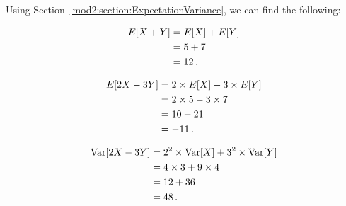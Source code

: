 %
%

\begin{subquestions}
	

\subquestion

Using Section~\ref{mod2:section:ExpectationVariance}, we can find the following:

\begin{subsubquestions}
	
\subsubquestion

\begin{align}
	E[X+Y] & = E[X] + E[Y] \nonumber \\
	       & = 5 + 7 \nonumber \\
	       & = 12 \,.
\end{align}


\subsubquestion

\begin{align}
	E[2X-3Y] & = 2 \times E[X] - 3 \times E[Y] \nonumber \\
	& = 2 \times 5 - 3 \times 7 \nonumber \\
	& = 10 - 21 \nonumber \\
	& = -11 \,.
\end{align}


\subsubquestion

\begin{align}
	\text{Var}[2X-3Y] & = 2^2 \times \text{Var}[X] + 3^2 \times \text{Var}[Y] \nonumber \\
	           & = 4 \times 3 + 9 \times 4 \nonumber \\
	           & = 12 + 36 \nonumber \\
	           & = 48 \,.	
\end{align}


\end{subsubquestions}
\end{subquestions}
